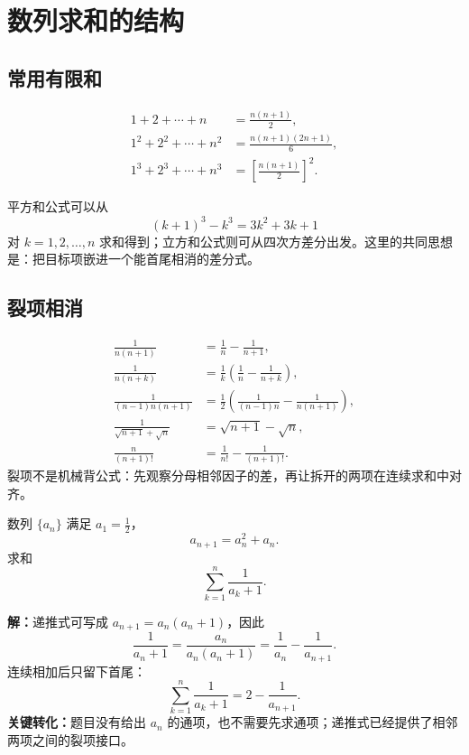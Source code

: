 \section{数列求和的结构}

\subsection{常用有限和}

\begin{lawbox}[三组基本公式]
  \begin{align*}
    1+2+\cdots+n&=\frac{n(n+1)}2,\\
    1^2+2^2+\cdots+n^2&=\frac{n(n+1)(2n+1)}6,\\
    1^3+2^3+\cdots+n^3&=\left[\frac{n(n+1)}2\right]^2.
  \end{align*}
\end{lawbox}

平方和公式可以从
\[
  (k+1)^3-k^3=3k^2+3k+1
\]
对 $k=1,2,\ldots,n$ 求和得到；立方和公式则可从四次方差分出发。这里的共同思想是：把目标项嵌进一个能首尾相消的差分式。

\subsection{裂项相消}

\begin{corollarybox}[常见裂项形状]
  \begin{align*}
    \frac1{n(n+1)}&=\frac1n-\frac1{n+1},\\
    \frac1{n(n+k)}&=\frac1k\left(\frac1n-\frac1{n+k}\right),\\
    \frac1{(n-1)n(n+1)}&=\frac12\left(\frac1{(n-1)n}-\frac1{n(n+1)}\right),\\
    \frac1{\sqrt{n+1}+\sqrt n}&=\sqrt{n+1}-\sqrt n,\\
    \frac{n}{(n+1)!}&=\frac1{n!}-\frac1{(n+1)!}.
  \end{align*}
  裂项不是机械背公式：先观察分母相邻因子的差，再让拆开的两项在连续求和中对齐。
\end{corollarybox}

\begin{examplebox}
  数列 $\{a_n\}$ 满足 $a_1=\tfrac12$，
  \[
    a_{n+1}=a_n^2+a_n.
  \]
  求和
  \[
    \sum_{k=1}^{n}\frac1{a_k+1}.
  \]

  \textbf{解：}递推式可写成 $a_{n+1}=a_n(a_n+1)$，因此
  \[
    \frac1{a_n+1}
    =\frac{a_n}{a_n(a_n+1)}
    =\frac1{a_n}-\frac1{a_{n+1}}.
  \]
  连续相加后只留下首尾：
  \[
    \boxed{\sum_{k=1}^{n}\frac1{a_k+1}=2-\frac1{a_{n+1}}}.
  \]
  \textbf{关键转化：}题目没有给出 $a_n$ 的通项，也不需要先求通项；递推式已经提供了相邻两项之间的裂项接口。
\end{examplebox}

